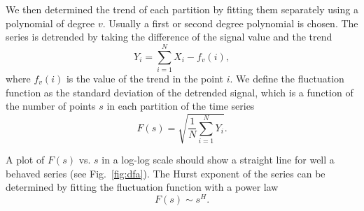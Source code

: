 We then determined the trend of each partition by fitting them separately using
a polynomial of degree $v$. Usually a first or second degree polynomial is
chosen. The series is detrended by taking the difference of the signal value and
the trend 
\begin{equation}
    Y_i = \sum_{i=1}^{N} X_i - f_v(i),
\end{equation}
where $f_v(i)$ is the value of the trend in the point $i$. We define the fluctuation
function as the standard deviation of the detrended signal, which is a function
of the number of points $s$ in each partition of the time series
\begin{equation}
    F(s) = \sqrt{\frac{1}{N}\sum_{i=1}^{N}Y_i}.
\end{equation}

A plot of $F(s)$ vs. $s$ in a log-log scale should show a straight line for
well a behaved series (see Fig.~\ref{fig:dfa}). The Hurst exponent of the
series can be determined by fitting the fluctuation function with a power law
\begin{equation}
    F(s)\sim s^H.
\end{equation}

